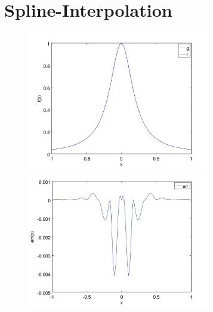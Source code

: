 \documentclass[]{scrartcl}
\begin{document}
	\section{Spline-Interpolation}
	\begin{figure}[h]
		\centering
		\begin{minipage}{0.5\textwidth}
			\includegraphics[width=8cm,keepaspectratio]{runge_spline}
			\caption{\label{Abb.5}}
		\end{minipage}
		\begin{minipage}{0.49\textwidth}
			\includegraphics[width=8cm,keepaspectratio]{runge_spline_err}
			\caption{\label{Abb.6}}
		\end{minipage}
	\end{figure}
	
\end{document}
